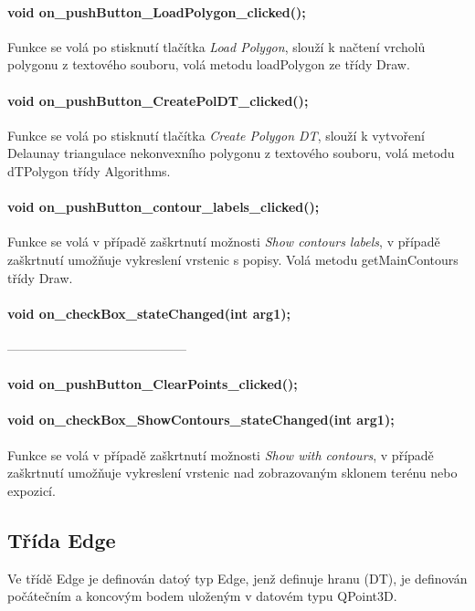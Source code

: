 \documentclass[11pt]{article}
\begin{document}
\paragraph {void on\_pushButton\_LoadPolygon\_clicked();}
Funkce se volá po stisknutí tlačítka \textit{Load Polygon}, slouží k načtení vrcholů polygonu z textového souboru, volá metodu loadPolygon ze třídy Draw.

\paragraph {void on\_pushButton\_CreatePolDT\_clicked();}
Funkce se volá po stisknutí tlačítka \textit{Create Polygon DT}, slouží k vytvoření Delaunay triangulace nekonvexního polygonu z textového souboru, volá metodu dTPolygon třídy Algorithms.

\paragraph {void on\_pushButton\_contour\_labels\_clicked();}
Funkce se volá v případě zaškrtnutí možnosti \textit{Show contours labels}, v případě zaškrtnutí umožňuje vykreslení vrstenic s popisy. Volá metodu getMainContours třídy Draw.

\paragraph {void on\_checkBox\_stateChanged(int arg1);}
------------------------------------------

\paragraph {void on\_pushButton\_ClearPoints\_clicked();}

\paragraph {void on\_checkBox\_ShowContours\_stateChanged(int arg1);}
Funkce se volá v případě zaškrtnutí možnosti \textit{Show with contours}, v případě zaškrtnutí umožňuje vykreslení vrstenic nad zobrazovaným sklonem terénu nebo expozicí.

\subsection{Třída Edge}
Ve třídě Edge je definován datoý typ Edge, jenž definuje hranu (DT), je definován počátečním a koncovým bodem uloženým v datovém typu QPoint3D.
\end{document}
